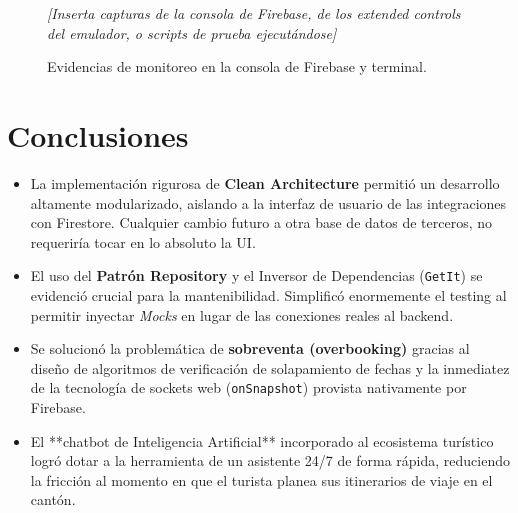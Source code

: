\documentclass{article}
\begin{document}
\begin{figure}[H]
    \centering
    \textit{[Inserta capturas de la consola de Firebase, de los extended controls del emulador, o scripts de prueba ejecutándose]}
    \caption{Evidencias de monitoreo en la consola de Firebase y terminal.}
\end{figure}

\section{Conclusiones}
\begin{itemize}[label=\small\color{verdeO}$\blacksquare$]
    \item La implementación rigurosa de \textbf{Clean Architecture} permitió un desarrollo altamente modularizado, aislando a la interfaz de usuario de las integraciones con Firestore. Cualquier cambio futuro a otra base de datos de terceros, no requeriría tocar en lo absoluto la UI.
    \item El uso del \textbf{Patrón Repository} y el Inversor de Dependencias (\texttt{GetIt}) se evidenció crucial para la mantenibilidad. Simplificó enormemente el testing al permitir inyectar \textit{Mocks} en lugar de las conexiones reales al backend.
    \item Se solucionó la problemática de \textbf{sobreventa (overbooking)} gracias al diseño de algoritmos de verificación de solapamiento de fechas y la inmediatez de la tecnología de sockets web (\texttt{onSnapshot}) provista nativamente por Firebase.
    \item El **chatbot de Inteligencia Artificial** incorporado al ecosistema turístico logró dotar a la herramienta de un asistente 24/7 de forma rápida, reduciendo la fricción al momento en que el turista planea sus itinerarios de viaje en el cantón.
\end{itemize}
\end{document}
